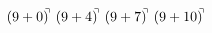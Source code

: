 \documentclass[preview]{standalone}
\begin{document}
\begin{align*}
(9+0)^{\hspace{-0.1cm}\urcorner} \ (9+4)^{\hspace{-0.1cm}\urcorner} \ (9+7)^{\hspace{-0.1cm}\urcorner} \ (9+10)^{\hspace{-0.1cm}\urcorner}
\end{align*}
\end{document}
